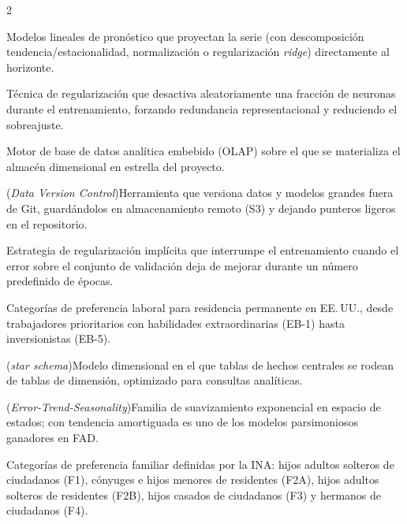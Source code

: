 \documentclass[12pt,letterpaper]{report}
\begin{document}
\begin{multicols}{2}
\begin{description}[leftmargin=0pt, labelindent=0pt, itemindent=0pt,
                    labelsep=0.4em, font=\bfseries\scriptsize,
                    itemsep=1pt, parsep=0pt, topsep=0pt]
    \item[DLinear / NLinear / RLinear] Modelos lineales de pronóstico que proyectan la serie (con descomposición tendencia/estacionalidad, normalización o regularización \textit{ridge}) directamente al horizonte.

    \item[Dropout] Técnica de regularización que desactiva aleatoriamente una fracción de neuronas durante el entrenamiento, forzando redundancia representacional y reduciendo el sobreajuste.

    \item[DuckDB] Motor de base de datos analítica embebido (OLAP) sobre el que se materializa el almacén dimensional en estrella del proyecto.

    \item[DVC] (\textit{Data Version Control})\hspace{0.3em}Herramienta que versiona datos y modelos grandes fuera de Git, guardándolos en almacenamiento remoto (S3) y dejando punteros ligeros en el repositorio.

    \item[Early Stopping] Estrategia de regularización implícita que interrumpe el entrenamiento cuando el error sobre el conjunto de validación deja de mejorar durante un número predefinido de épocas.

    \item[EB-1 a EB-5] Categorías de preferencia laboral para residencia permanente en EE.\,UU., desde trabajadores prioritarios con habilidades extraordinarias (EB-1) hasta inversionistas (EB-5).

    \item[Esquema en estrella] (\textit{star schema})\hspace{0.3em}Modelo dimensional en el que tablas de hechos centrales se rodean de tablas de dimensión, optimizado para consultas analíticas.

    \item[ETS] (\textit{Error-Trend-Seasonality})\hspace{0.3em}Familia de suavizamiento exponencial en espacio de estados; con tendencia amortiguada es uno de los modelos parsimoniosos ganadores en FAD.

    \item[F1, F2A, F2B, F3, F4] Categorías de preferencia familiar definidas por la INA: hijos adultos solteros de ciudadanos (F1), cónyuges e hijos menores de residentes (F2A), hijos adultos solteros de residentes (F2B), hijos casados de ciudadanos (F3) y hermanos de ciudadanos (F4).


\end{description}
\end{multicols}
\end{document}
